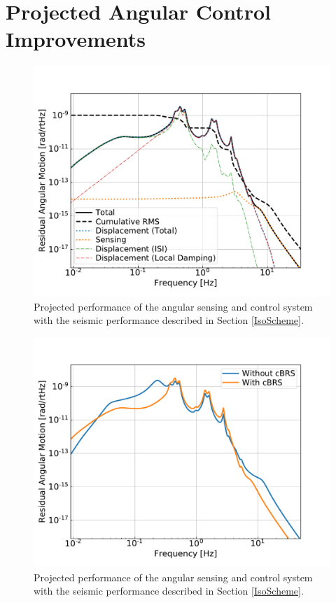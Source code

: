 \documentclass [12pt, proquest]{uwthesis}[2019]
\begin{document}
\section{Projected Angular Control Improvements}

\begin{figure}
\begin{center}
\includegraphics[width=\textwidth]{cBRS_ASC_With.pdf}
\caption{Projected performance of the angular sensing and control system with the seismic performance described in Section \ref{IsoScheme}.}
\label{ascWith}
\end{center}
\end{figure}

\begin{figure}
\begin{center}
\includegraphics[width=\textwidth]{cBRS_ASC_LowF.pdf}
\caption{Projected performance of the angular sensing and control system with the seismic performance described in Section \ref{IsoScheme}.}
\label{ascComp}
\end{center}
\end{figure}
\end{document}
